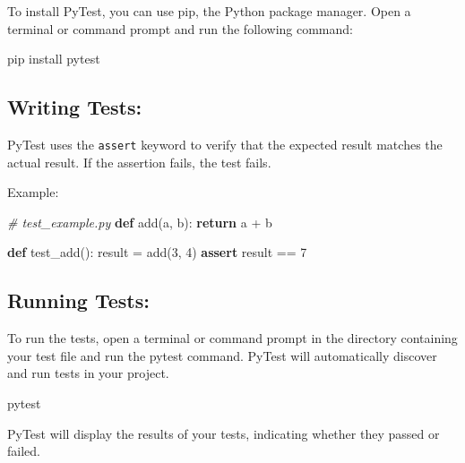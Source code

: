 \documentclass[
  paper=a4,
  ,captions=tableheading
]{scrartcl}
\newenvironment{Shaded}{}{}
\newcommand{\CommentTok}[1]{\textcolor[rgb]{0.38,0.63,0.69}{\textit{#1}}}
\newcommand{\ControlFlowTok}[1]{\textcolor[rgb]{0.00,0.44,0.13}{\textbf{#1}}}
\newcommand{\DecValTok}[1]{\textcolor[rgb]{0.25,0.63,0.44}{#1}}
\newcommand{\ExtensionTok}[1]{#1}
\newcommand{\KeywordTok}[1]{\textcolor[rgb]{0.00,0.44,0.13}{\textbf{#1}}}
\newcommand{\NormalTok}[1]{#1}
\newcommand{\OperatorTok}[1]{\textcolor[rgb]{0.40,0.40,0.40}{#1}}
\begin{document}
To install PyTest, you can use pip, the Python package manager. Open a
terminal or command prompt and run the following command:

\begin{Shaded}
\begin{Highlighting}[]
\ExtensionTok{pip}\NormalTok{ install pytest}
\end{Highlighting}
\end{Shaded}

\hypertarget{writing-tests}{%
\subsection{Writing Tests:}\label{writing-tests}}

PyTest uses the \texttt{assert} keyword to verify that the expected
result matches the actual result. If the assertion fails, the test
fails.

Example:

\begin{Shaded}
\begin{Highlighting}[]
\CommentTok{\# test\_example.py}
\KeywordTok{def}\NormalTok{ add(a, b):}
    \ControlFlowTok{return}\NormalTok{ a }\OperatorTok{+}\NormalTok{ b}

\KeywordTok{def}\NormalTok{ test\_add():}
\NormalTok{    result }\OperatorTok{=}\NormalTok{ add(}\DecValTok{3}\NormalTok{, }\DecValTok{4}\NormalTok{)}
    \ControlFlowTok{assert}\NormalTok{ result }\OperatorTok{==} \DecValTok{7}
\end{Highlighting}
\end{Shaded}

\hypertarget{running-tests}{%
\subsection{Running Tests:}\label{running-tests}}

To run the tests, open a terminal or command prompt in the directory
containing your test file and run the pytest command. PyTest will
automatically discover and run tests in your project.

\begin{Shaded}
\begin{Highlighting}[]
\ExtensionTok{pytest}
\end{Highlighting}
\end{Shaded}

PyTest will display the results of your tests, indicating whether they
passed or failed.
\end{document}
